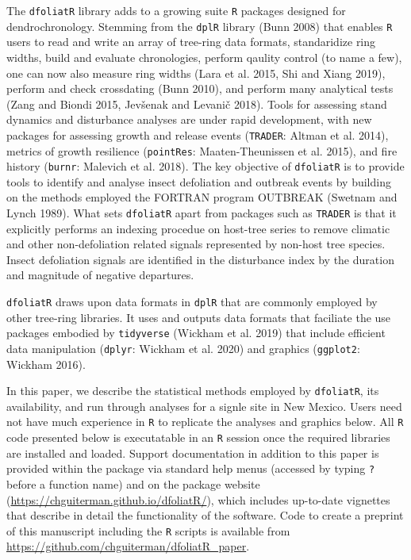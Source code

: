 \documentclass[review]{elsarticle} %
\begin{document}
The \texttt{dfoliatR} library adds to a growing suite \texttt{R}
packages designed for dendrochronology. Stemming from the \texttt{dplR}
library (Bunn 2008) that enables \texttt{R} users to read and write an
array of tree-ring data formats, standaridize ring widths, build and
evaluate chronologies, perform qaulity control (to name a few), one can
now also measure ring widths (Lara et al. 2015, Shi and Xiang 2019),
perform and check crossdating (Bunn 2010), and perform many analytical
tests (Zang and Biondi 2015, Jevšenak and Levanič 2018). Tools for
assessing stand dynamics and disturbance analyses are under rapid
development, with new packages for assessing growth and release events
(\texttt{TRADER}: Altman et al. 2014), metrics of growth resilience
(\texttt{pointRes}: Maaten-Theunissen et al. 2015), and fire history
(\texttt{burnr}: Malevich et al. 2018). The key objective of
\texttt{dfoliatR} is to provide tools to identify and analyse insect
defoliation and outbreak events by building on the methods employed the
FORTRAN program OUTBREAK (Swetnam and Lynch 1989). What sets
\texttt{dfoliatR} apart from packages such as \texttt{TRADER} is that it
explicitly performs an indexing procedue on host-tree series to remove
climatic and other non-defoliation related signals represented by
non-host tree species. Insect defoliation signals are identified in the
disturbance index by the duration and magnitude of negative departures.

\texttt{dfoliatR} draws upon data formats in \texttt{dplR} that are
commonly employed by other tree-ring libraries. It uses and outputs data
formats that faciliate the use packages embodied by \texttt{tidyverse}
(Wickham et al. 2019) that include efficient data manipulation
(\texttt{dplyr}: Wickham et al. 2020) and graphics (\texttt{ggplot2}:
Wickham 2016).

In this paper, we describe the statistical methods employed by
\texttt{dfoliatR}, its availability, and run through analyses for a
signle site in New Mexico. Users need not have much experience in
\texttt{R} to replicate the analyses and graphics below. All \texttt{R}
code presented below is executatable in an \texttt{R} session once the
required libraries are installed and loaded. Support documentation in
addition to this paper is provided within the package via standard help
menus (accessed by typing \texttt{?} before a function name) and on the
package website (\url{https://chguiterman.github.io/dfoliatR/}), which
includes up-to-date vignettes that describe in detail the functionality
of the software. Code to create a preprint of this manuscript including
the \texttt{R} scripts is available from
\url{https://github.com/chguiterman/dfoliatR_paper}.
\end{document}
